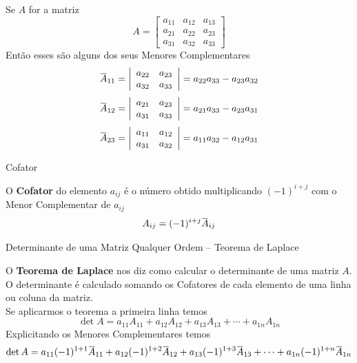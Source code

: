 \begin{exemplos}
    \begin{exemplo}
        Se $A$ for a matriz
        \[ A = \left[\begin{array}{ccc}
        a_{11} & a_{12} & a_{13} \\ 
        a_{21} & a_{22} & a_{23} \\ 
        a_{31} & a_{32} & a_{33}
        \end{array}\right]
        \]
        Então esses são alguns dos seus Menores Complementares
        \[  \minor{A}_{11} = \left|\begin{array}{cc}
        	a_{22} & a_{23} \\
        	a_{32} & a_{33}
        \end{array}\right| = a_{22} a_{33} - a_{23} a_{32} 
        \]
        \[ \minor{A}_{12} = \left|\begin{array}{cc}
        	a_{21} & a_{23} \\
        	a_{31} & a_{33}
        \end{array}\right|
        = a_{21} a_{33} - a_{23} a_{31}
        \]
        \[ \minor{A}_{23} = \left|\begin{array}{cc}
        	a_{11} & a_{12} \\
        	a_{31} & a_{32}
        \end{array}\right|
        = a_{11} a_{32} - a_{12} a_{31}
        \]
    \end{exemplo}
\end{exemplos}

\begin{teoria}{Cofator}

    O \textbf{Cofator} do elemento $a_{ij}$ é o número obtido multiplicando $(-1)^{i+j}$ com o Menor Complementar de $a_{ij}$
    \[ A_{ij} = (-1)^{i+j} \minor{A}_{ij} \]
    
\end{teoria}

\begin{teoria}{Determinante de uma Matriz Qualquer Ordem -- Teorema de Laplace}
    
    O \textbf{Teorema de Laplace} nos diz como calcular o determinante de uma matriz $A$. \\
    
    O determinante é calculado somando os Cofatores de cada elemento de uma linha ou coluna da matriz.\\
    
    Se aplicarmos o teorema a primeira linha temos
    \[ \det A = a_{11} A_{11} + a_{12} A_{12} + a_{13} A_{13} + \cdots + a_{1n} A_{1n} \]
    Explicitando os Menores Complementares temos
    \[ \det A = a_{11}(-1)^{1+1}\minor{A}_{11} + 
                a_{12}(-1)^{1+2}\minor{A}_{12} + 
                a_{13}(-1)^{1+3}\minor{A}_{13} + \cdots + 
                a_{1n}(-1)^{1+n}\minor{A}_{1n} \]

\end{teoria}

